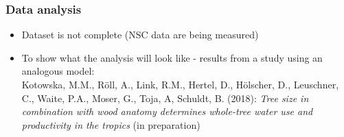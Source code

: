 \documentclass[usepdftitle=false]{beamer}
\begin{document}
\begin{frame}
	\frametitle{Data analysis}
	\begin{itemize}
		\item Dataset is not complete (NSC data are being measured)
		\item To show what the analysis will look like - results from a study using an analogous model:\\
		
		\vspace{1em} Kotowska, M.M., Röll, A., \alert{Link, R.M.,} Hertel, D., Hölscher, D., Leuschner, C., Waite, P.A., Moser, G., Toja, A, Schuldt, B. (2018): \textit{Tree size in combination with wood anatomy determines whole-tree water use and productivity in the tropics} (in preparation)		
		
	\end{itemize}
\end{frame}
\end{document}
